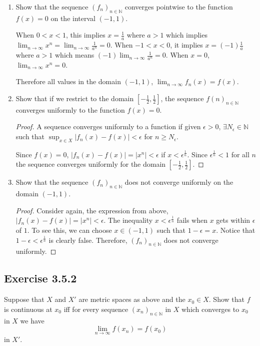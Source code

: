 \documentclass{tufte-book}
\theoremstyle{mytheoremstyle}
\theoremstyle{mylemstyle}
\theoremstyle{mydefstyle}
\begin{document}
\begin{enumerate}

\item Show that the sequence $(f_n)_{n \in \mathbb{N}}$ converges pointwise to the function $f(x) = 0$ on the interval $(-1,1)$.

When $0 < x < 1$, this implies $x = \frac{1}{a}$ where $a > 1$ which implies $\lim_{n \to \infty} x^n = \lim_{n \to \infty} \frac{1}{a^n} = 0$.  When $-1 < x < 0$, it implies $x=(-1)\frac{1}{a}$ where $a > 1$ which means $(-1)\lim_{n \to \infty}\frac{1}{a^n} = 0$.  When $x=0$, $\lim_{n \to \infty} x^n = 0$. 

Therefore all values in the domain $(-1,1)$, $\lim_{n \to \infty}f_n(x) = f(x)$.

\item Show that if we restrict to the domain $[-\frac{1}{2}, \frac{1}{2}]$, the sequence $f(n)_{n \in \mathbb{N}}$ converges uniformly to the function $f(x) = 0$.

\begin{proof}
A sequence converges uniformly to a function if given $\epsilon >0$, $\exists N_\epsilon \in \mathbb{N}$ such that $\sup_{x \in X}|f_n(x) - f(x)| < \epsilon$ for $n \geq N_\epsilon$.

Since $f(x) = 0$, $|f_n(x) - f(x)| = |x^n| < \epsilon$ if $x < \epsilon^\frac{1}{n}$.  Since $\epsilon^\frac{1}{n} < 1$ for all $n$ the sequence converges uniformly for the domain $[-\frac{1}{2}, \frac{1}{2}]$.
\end{proof}

\item Show that the sequence $(f_n)_{n \in \mathbb{N}}$ does not converge uniformly on the domain $(-1,1)$.

\begin{proof}
Consider again, the expression from above, $|f_n(x) - f(x)| = |x^n| < \epsilon$.  The inequality $x < \epsilon^\frac{1}{n}$ fails when $x$ gets within $\epsilon$ of $1$.  To see this, we can choose $x \in (-1,1)$ such that $1-\epsilon = x$. Notice that $1-\epsilon < \epsilon^\frac{1}{n}$ is clearly false.  Therefore, $(f_n)_{n \in \mathbb{N}}$ does not converge uniformly.
\end{proof}

\end{enumerate}


\subsection{Exercise 3.5.2}
Suppose that $X$ and $X'$ are metric spaces as above and the $x_0 \in X$. Show that $f$ is continuous at $x_0$ iff for every sequence $(x_n)_{n \in \mathbb{N}}$ in $X$ which converges to $x_0$ in $X$ we have
\[\lim_{n \to \infty}f(x_n) = f(x_0) \]
in $X'$.
\end{document}
